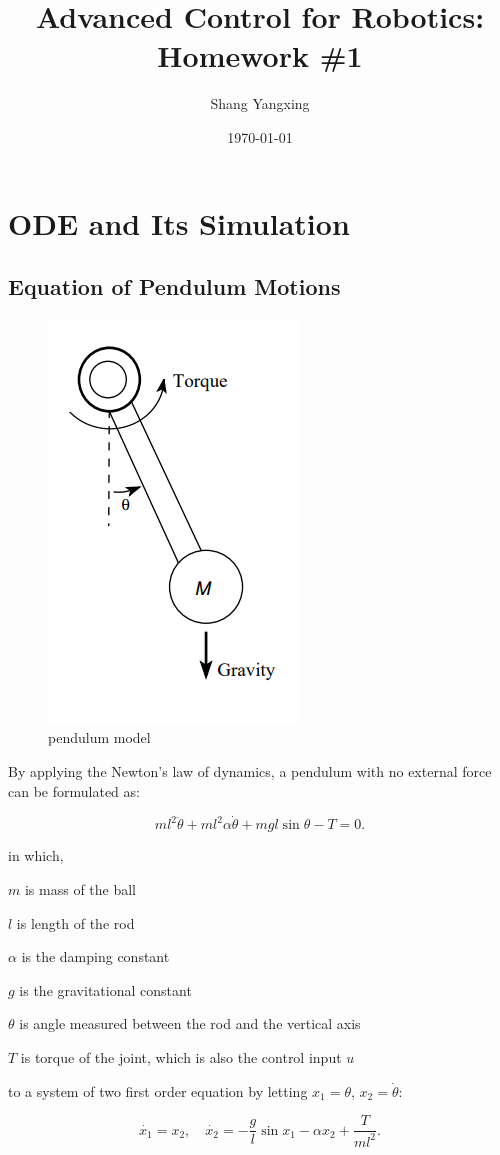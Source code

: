 \documentclass[titlepage]{article}
\title{\textbf{Advanced Control for Robotics: Homework \#1}}
\author{Shang Yangxing}
\date{\today}
\begin{document}
\maketitle

\section{ODE and Its Simulation}

\subsection{Equation of Pendulum Motions}

\begin{figure}[htbp]
    \centering
    \includegraphics[width=.2\textwidth]{img/pendulum.png}
    \caption{pendulum model}
    \label{fig:pendulum}
\end{figure}

By applying the Newton's law of dynamics, a pendulum with no external force can be formulated as:

\begin{equation}
    ml^2 \ddot{\theta} + ml^2 \alpha \dot{\theta} + mgl \sin{\theta} - T = 0.
\end{equation}

in which,

\quad $m$ is mass of the ball

\quad $l$ is length of the rod

\quad $\alpha$ is the damping constant

\quad $g$ is the gravitational constant

\quad $\theta$ is angle measured between the rod and the vertical axis

\quad $T$ is torque of the joint, which is also the control input $u$

to a system of two first order equation by letting $x_1=\theta$, $x_2=\dot{\theta}$:

\begin{equation}
    \dot{x_1} = x_2, \quad \dot{x_2} = - \frac{g}{l}\sin{x_1} -\alpha x_2 + \frac{T}{ml^2}.
\end{equation}
\end{document}
